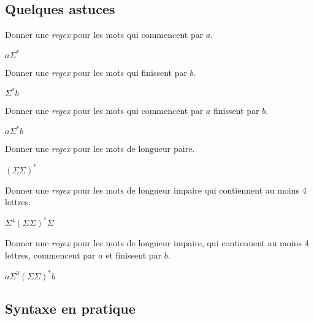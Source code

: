 \subsection{Quelques astuces}

\begin{exercice}
Donner une \textit{regex} pour les mots qui commencent par $a$.
\end{exercice}

\begin{correction*}
$a\Sigma^*$
\end{correction*}

\begin{exercice}
Donner une \textit{regex} pour les mots qui finissent par $b$.
\end{exercice}

\begin{correction*}
$\Sigma^*b$
\end{correction*}


\begin{exercice}
Donner une \textit{regex} pour les mots qui commencent par $a$ finissent par $b$.
\end{exercice}

\begin{correction*}
$a\Sigma^*b$
\end{correction*}


\begin{exercice}
Donner une \textit{regex} pour les mots de longueur paire.
\end{exercice}

\begin{correction*}
$(\Sigma\Sigma)^*$
\end{correction*}


\begin{exercice}
Donner une \textit{regex} pour les mots de longueur impaire qui contiennent au moins 4 lettres.
\end{exercice}

\begin{correction*}
$\Sigma^4(\Sigma\Sigma)^*\Sigma$
\end{correction*}


\begin{exercice}
Donner une \textit{regex} pour les mots de longueur impaire, qui contiennent au moins 4 lettres, commencent par $a$ et finissent par $b$.
\end{exercice}


\begin{correction*}
$a\Sigma^3(\Sigma\Sigma)^*b$
\end{correction*}

\subsection{Syntaxe en pratique}


